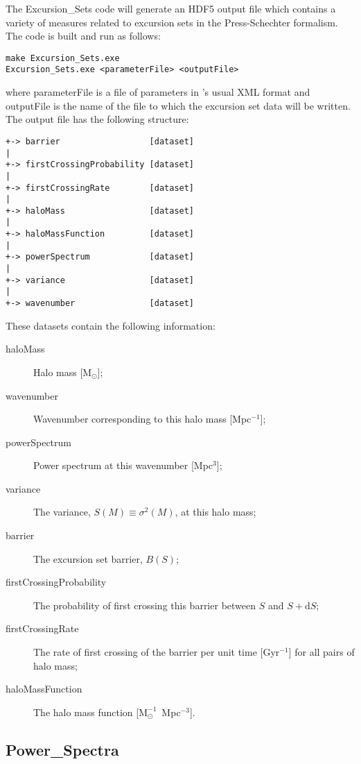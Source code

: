 The {\normalfont \ttfamily Excursion\_Sets} code will generate an HDF5 output file which contains a variety of measures related to excursion sets in the Press-Schechter formalism. The code is built and run as follows:
\begin{verbatim}
make Excursion_Sets.exe
Excursion_Sets.exe <parameterFile> <outputFile>
\end{verbatim}
where {\normalfont \ttfamily parameterFile} is a file of parameters in \glc's usual XML format and {\normalfont \ttfamily outputFile} is the name of the file to which the excursion set data will be written. The output file has the following structure:
\begin{verbatim}
+-> barrier                  [dataset]
|
+-> firstCrossingProbability [dataset]
|
+-> firstCrossingRate        [dataset]
|
+-> haloMass                 [dataset]
|
+-> haloMassFunction         [dataset]
|
+-> powerSpectrum            [dataset]
|
+-> variance                 [dataset]
|
+-> wavenumber               [dataset]
\end{verbatim}
These datasets contain the following information:
\begin{description}
 \item [{\normalfont \ttfamily haloMass}] Halo mass [$\mathrm{M}_\odot$];
 \item [{\normalfont \ttfamily wavenumber}] Wavenumber corresponding to this halo mass [Mpc$^{-1}$];
 \item [{\normalfont \ttfamily powerSpectrum}] Power spectrum at this wavenumber [Mpc$^3$];
 \item [{\normalfont \ttfamily variance}] The variance, $S(M)\equiv\sigma^2(M)$, at this halo mass;
 \item [{\normalfont \ttfamily barrier}] The excursion set barrier, $B(S)$;
 \item [{\normalfont \ttfamily firstCrossingProbability}] The probability of first crossing this barrier between $S$ and $S+\mathrm{d}S$;
 \item [{\normalfont \ttfamily firstCrossingRate}] The rate of first crossing of the barrier per unit time [Gyr$^{-1}$] for all pairs of halo mass;
 \item [{\normalfont \ttfamily haloMassFunction}] The halo mass function [$\mathrm{M}^{-1}_\odot$~Mpc$^{-3}$].
\end{description}

\subsection{{\normalfont \ttfamily Power\_Spectra}}

